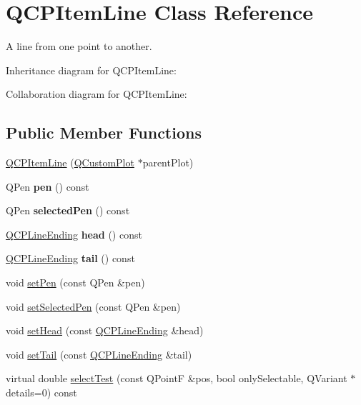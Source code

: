\hypertarget{classQCPItemLine}{}\section{Q\+C\+P\+Item\+Line Class Reference}
\label{classQCPItemLine}


A line from one point to another.  




Inheritance diagram for Q\+C\+P\+Item\+Line\+:


Collaboration diagram for Q\+C\+P\+Item\+Line\+:
\subsection*{Public Member Functions}
\begin{DoxyCompactItemize}
\item 
\hyperlink{classQCPItemLine_a17804b7f64961c6accf25b61e85142e3}{Q\+C\+P\+Item\+Line} (\hyperlink{classQCustomPlot}{Q\+Custom\+Plot} $\ast$parent\+Plot)
\item 
Q\+Pen {\bfseries pen} () const \hypertarget{classQCPItemLine_a235779dd079a263bedb20b3daecc40eb}{}\label{classQCPItemLine_a235779dd079a263bedb20b3daecc40eb}

\item 
Q\+Pen {\bfseries selected\+Pen} () const \hypertarget{classQCPItemLine_a9fde5e95a1a369008252e18f1925650c}{}\label{classQCPItemLine_a9fde5e95a1a369008252e18f1925650c}

\item 
\hyperlink{classQCPLineEnding}{Q\+C\+P\+Line\+Ending} {\bfseries head} () const \hypertarget{classQCPItemLine_a5f6cbc5c763feae9dfbce71748fc43f1}{}\label{classQCPItemLine_a5f6cbc5c763feae9dfbce71748fc43f1}

\item 
\hyperlink{classQCPLineEnding}{Q\+C\+P\+Line\+Ending} {\bfseries tail} () const \hypertarget{classQCPItemLine_a5d2ca0f784933e80f3e6e1d15dceebb3}{}\label{classQCPItemLine_a5d2ca0f784933e80f3e6e1d15dceebb3}

\item 
void \hyperlink{classQCPItemLine_a572528dab61c1abe205822fbd5db4b27}{set\+Pen} (const Q\+Pen \&pen)
\item 
void \hyperlink{classQCPItemLine_a3e2fec44503277e77717e9c24f87f1ea}{set\+Selected\+Pen} (const Q\+Pen \&pen)
\item 
void \hyperlink{classQCPItemLine_aebf3d687114d584e0459db6759e2c3c3}{set\+Head} (const \hyperlink{classQCPLineEnding}{Q\+C\+P\+Line\+Ending} \&head)
\item 
void \hyperlink{classQCPItemLine_ac264222c3297a7efe33df9345c811a5f}{set\+Tail} (const \hyperlink{classQCPLineEnding}{Q\+C\+P\+Line\+Ending} \&tail)
\item 
virtual double \hyperlink{classQCPItemLine_a7541e5d9378ca121d07b0df3b24f7178}{select\+Test} (const Q\+PointF \&pos, bool only\+Selectable, Q\+Variant $\ast$details=0) const 
\end{DoxyCompactItemize}
